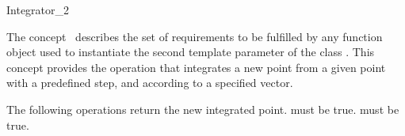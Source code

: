 

\begin{ccRefFunctionObjectConcept}{Integrator_2}


\ccDefinition
  
The concept \ccRefName\ describes the set of requirements to be
fulfilled by any function object used to instantiate the second
template parameter of the class
.  This concept provides
the operation that integrates a new point from a given point with a
predefined step, and according to a specified vector.


\ccTypes
{}
\ccGlue
{}
\ccGlue
{}
\ccGlue

\ccCreation
{}  %
\ccGlue

\ccOperations
{}
The following operations return the new integrated point.
{\ccPrecond {} must be true.}
\ccGlue
{}
{\ccPrecond {} must be true.}
\ccGlue

\ccHasModels
{} \\
 \\
\end{ccRefFunctionObjectConcept}



